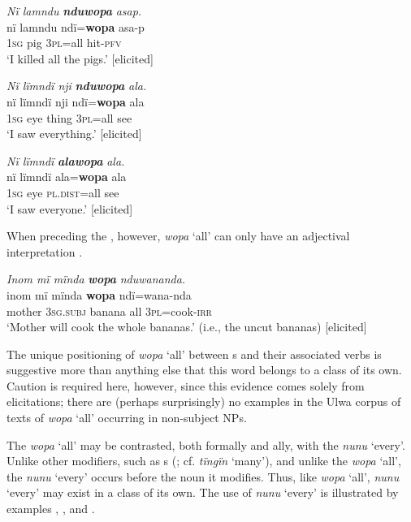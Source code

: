 \ea%
    \label{ex:det:181}
          \textit{Nï lamndu} \textbf{\textit{nduwopa}} \textit{asap.}\\
\gll    nï    lamndu  ndï=\textbf{wopa}  asa-p\\
    1\textsc{sg}  pig      \textsc{3pl}=all  hit-\textsc{pfv}\\
\glt `I killed all the pigs.’ [elicited]
\z

\ea%
    \label{ex:det:182}
          \textit{Nï lïmndï nji} \textbf{\textit{nduwopa}} \textit{ala.}\\
\gll    nï    lïmndï  nji    ndï=\textbf{wopa}  ala\\
    \textsc{1sg}  eye    thing  \textsc{3pl}=all  see\\
\glt `I saw everything.’ [elicited]
\z

\ea%
    \label{ex:det:183}
          \textit{Nï lïmndï} \textbf{\textit{alawopa}} \textit{ala.}\\
\gll    nï    lïmndï  ala=\textbf{wopa}    ala\\
    \textsc{1sg}  eye    \textsc{pl.dist}=all  see\\
\glt `I saw everyone.’ [elicited]
\z

When preceding the , however, \textit{wopa} ‘all’ can only have an  adjectival interpretation .

\ea%
    \label{ex:det:184}
          \textit{Inom mï mïnda} \textbf{\textit{wopa}} \textit{nduwananda.}\\
\gll    inom  mï      mïnda  \textbf{wopa}  ndï=wana-nda\\
    mother  \textsc{3sg.subj}  banana  all    \textsc{3pl}=cook-\textsc{irr}\\
\glt `Mother will cook the whole bananas.’ (i.e., the uncut bananas) [elicited]
\z

The unique positioning of \textit{wopa} ‘all’ between s and their associated verbs is suggestive more than anything else that this word belongs to a  class of its own. Caution is required here, however, since this evidence comes solely from elicitations; there are (perhaps surprisingly) no examples in the Ulwa corpus of texts of \textit{wopa} ‘all’ occurring in non-subject NPs.

  The   \textit{wopa} ‘all’ may be contrasted, both formally and ally, with the   \textit{nunu} ‘every’. Unlike other modifiers, such as s (; cf. \textit{tïngïn} ‘many’), and unlike the  \textit{wopa} ‘all’, the  \textit{nunu} ‘every’ occurs before the noun it modifies. Thus, like \textit{wopa} ‘all’, \textit{nunu} ‘every’ may exist in a class of its own. The use of \textit{nunu} ‘every’ is illustrated by examples , , and .


